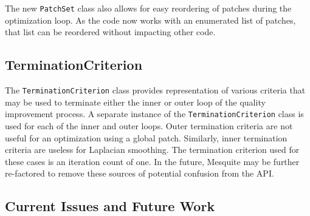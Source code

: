 \documentclass{article}
\begin{document}
The new \texttt{PatchSet} class also allows for easy reordering of patches during the optimization loop.  As the code now works with an enumerated list of patches, that list can be reordered without impacting other code.

\subsection{TerminationCriterion}

The \texttt{TerminationCriterion} class provides representation of various criteria that may be used to terminate either the inner or outer loop of the quality improvement process.  A separate instance of the \texttt{TerminationCriterion} class is used for each of the inner and outer loops.  Outer termination criteria are not useful for an optimization using a global patch.  Similarly, inner termination criteria are useless for Laplacian smoothing.  The termination criterion used for these cases is an iteration count of one.  In the future, Mesquite may be further re-factored to remove these sources of potential confusion from the API.

\subsection{Current Issues and Future Work}
\end{document}
